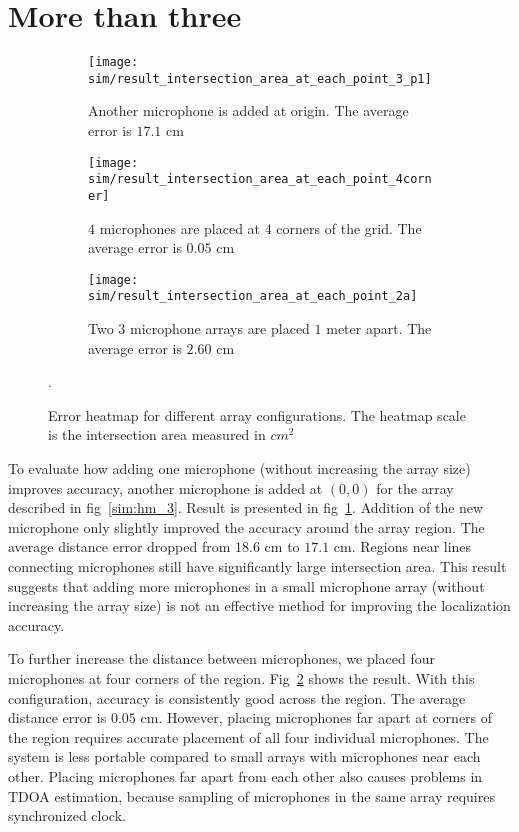 \section{More than three}

\begin{figure*}[h!]
  \centering
  \begin{subfigure}[]{.48\textwidth}
    \texttt{[image: sim/result\_intersection\_area\_at\_each\_point\_3\_p1]}
    \caption{Another microphone is added at origin. The average error is $17.1$ cm}
    \label{fig:sim_hm_3_p1}
  \end{subfigure}
  \begin{subfigure}[]{.48\textwidth}
    \texttt{[image: sim/result\_intersection\_area\_at\_each\_point\_4corner]}
    \caption{$4$ microphones are placed at $4$ corners of the grid. The average error is $0.05$ cm}
    \label{fig:sim_hm_4}
  \end{subfigure}
  \begin{subfigure}[]{.48\textwidth}
    \texttt{[image: sim/result\_intersection\_area\_at\_each\_point\_2a]}
    \caption{Two $3$ microphone arrays are placed $1$ meter apart. The average error is $2.60$ cm}
    \label{fig:sim_hm_2_array}
  \end{subfigure}
  \caption{Error heatmap for different array configurations. The heatmap scale is the intersection area measured in $cm^2$}.
  \label{fig:sim_hm}
\end{figure*}

To evaluate how adding one microphone (without increasing the array size) improves accuracy, another microphone is added at $(0,0)$ for the array described in fig~\ref{sim:hm_3}. Result is presented in fig~\ref{fig:sim_hm_3_p1}. Addition of the new microphone only slightly improved the accuracy around the array region. The average distance error dropped from $18.6$ cm to $17.1$ cm. Regions near lines connecting microphones still have significantly large intersection area. This result suggests that adding more microphones in a small microphone array (without increasing the array size) is not an effective method for improving the localization accuracy.

To further increase the distance between microphones, we placed four microphones at four corners of the region. Fig~\ref{fig:sim_hm_4} shows the result. With this configuration, accuracy is consistently good across the region. The average distance error is $0.05$ cm.  However, placing microphones far apart at corners of the region requires accurate placement of all four individual microphones. The system is less portable compared to small arrays with microphones near each other. Placing microphones far apart from each other also causes problems in TDOA estimation, because sampling of microphones in the same array requires synchronized clock.

